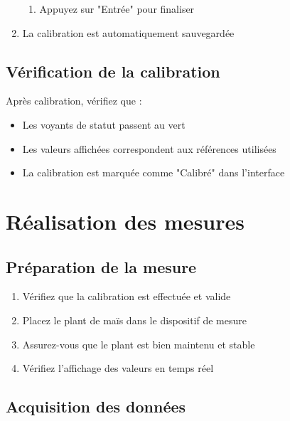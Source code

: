 \documentclass[12pt,a4paper]{article}
\begin{document}
\begin{enumerate}
\begin{enumerate}
        \item Appuyez sur "Entrée" pour finaliser
    \end{enumerate}
    
    \item La calibration est automatiquement sauvegardée
\end{enumerate}

\subsection{Vérification de la calibration}

Après calibration, vérifiez que :
\begin{itemize}
    \item Les voyants de statut passent au vert
    \item Les valeurs affichées correspondent aux références utilisées
    \item La calibration est marquée comme "Calibré" dans l'interface
\end{itemize}

\section{Réalisation des mesures}

\subsection{Préparation de la mesure}

\begin{enumerate}
    \item Vérifiez que la calibration est effectuée et valide
    \item Placez le plant de maïs dans le dispositif de mesure
    \item Assurez-vous que le plant est bien maintenu et stable
    \item Vérifiez l'affichage des valeurs en temps réel
\end{enumerate}

\subsection{Acquisition des données}
\end{document}
